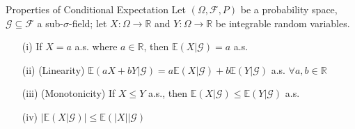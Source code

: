 \begin{theorem}{Properties of Conditional Expectation}
Let \((\Omega, \mathcal{F}, P)\) be a probability space, \(\mathcal{G} \subseteq \mathcal{F}\) a sub-\(\sigma\)-field; let \(X: \Omega \rightarrow \mathbb{R}\) and \(Y: \Omega \rightarrow \mathbb{R}\) be integrable random variables.
\begin{itemize}
    \item[(i)] If \(X = a\) a.s. where \(a \in \mathbb{R}\), then \(\mathbb{E}(X|\mathcal{G}) = a\) a.s.
    \item[(ii)] (Linearity) \(\mathbb{E}(aX + bY | \mathcal{G}) = a \mathbb{E}(X|\mathcal{G}) + b \mathbb{E}(Y|\mathcal{G})\) a.s. \quad \(\forall a, b \in \mathbb{R}\)
    \item[(iii)] (Monotonicity) If \(X \leq Y\) a.s., then \(\mathbb{E}(X|\mathcal{G}) \leq \mathbb{E}(Y|\mathcal{G})\) a.s.
    \item[(iv)] \(\left| \mathbb{E}(X|\mathcal{G}) \right| \leq \mathbb{E}(|X| | \mathcal{G})\)
\end{itemize}
\end{theorem}
